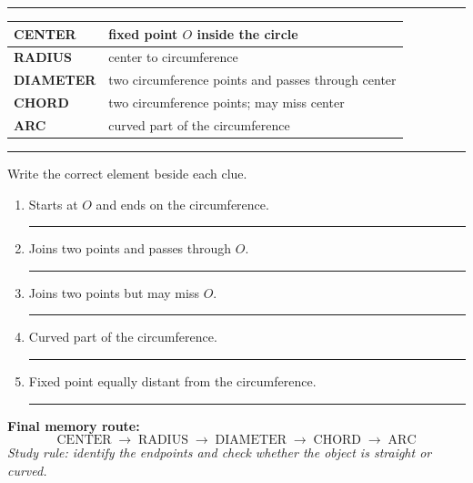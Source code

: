 \documentclass[11pt]{article}
\newcommand{\Term}[1]{\vspace{0.1cm}{\Large\bfseries #1}\par\vspace{0.2cm}\hrule\vspace{0.45cm}}
\begin{document}
\Term{6. PUT THE FIVE ELEMENTS TOGETHER}
\begin{center}
\end{center}
\vspace{0.35cm}
\renewcommand{\arraystretch}{1.45}
\begin{center}
\begin{tabular}{|>{\bfseries}p{3.4cm}|p{10.2cm}|}\hline
CENTER & fixed point $O$ inside the circle \\ \hline
RADIUS & center to circumference \\ \hline
DIAMETER & two circumference points and passes through center \\ \hline
CHORD & two circumference points; may miss center \\ \hline
ARC & curved part of the circumference \\ \hline
\end{tabular}
\end{center}
\newpage

\Term{7. NOTEBOOK CHECK}
Write the correct element beside each clue.
\begin{enumerate}[leftmargin=1.1cm,itemsep=0.55cm]
\item Starts at $O$ and ends on the circumference. \hfill \rule{5cm}{0.3pt}
\item Joins two points and passes through $O$. \hfill \rule{5cm}{0.3pt}
\item Joins two points but may miss $O$. \hfill \rule{5cm}{0.3pt}
\item Curved part of the circumference. \hfill \rule{5cm}{0.3pt}
\item Fixed point equally distant from the circumference. \hfill \rule{5cm}{0.3pt}
\end{enumerate}
\vspace{0.8cm}
\textbf{Final memory route:}
\[
\boxed{\text{CENTER}}\;\longrightarrow\;\boxed{\text{RADIUS}}\;\longrightarrow\;\boxed{\text{DIAMETER}}\;\longrightarrow\;\boxed{\text{CHORD}}\;\longrightarrow\;\boxed{\text{ARC}}
\]
\vfill
\textit{Study rule: identify the endpoints and check whether the object is straight or curved.}
\end{document}
